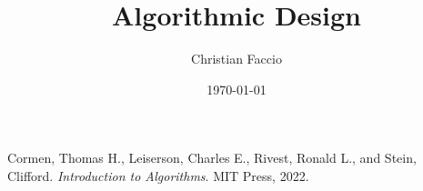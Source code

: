 \documentclass[a4paper,12pt]{report}
\institute{UniTs - University of Trieste}
\title{Algorithmic Design}
\author{Christian Faccio}
\date{\today}
\begin{document}
\maketitle



\toc






\begin{thebibliography}{9}
    Cormen, Thomas H., Leiserson, Charles E., Rivest, Ronald L., and Stein, Clifford. 
    \textit{Introduction to Algorithms}. 
    MIT Press, 2022.
\end{thebibliography}
\end{document}

